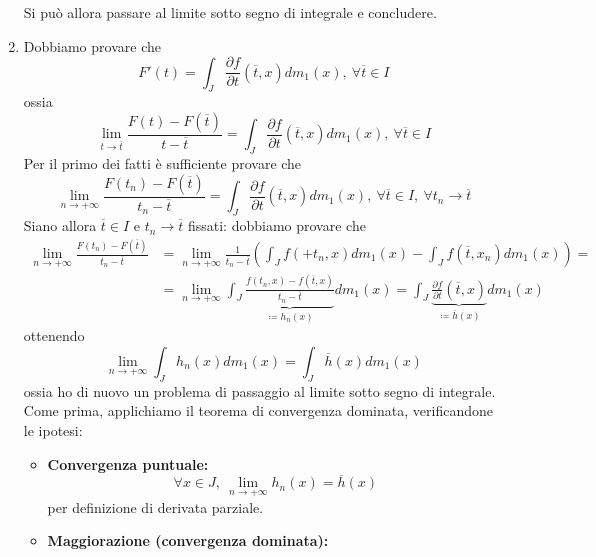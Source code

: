 \begin{demonstrationcaputwt}
\begin{enumerate}[label=\Roman*]
		Si può allora passare al limite sotto segno di integrale e concludere.
		\item Dobbiamo provare che
		\begin{equation*}
			F'(t)=\int_J\frac{\partial f}{\partial t}\left(\overline{t},x\right)dm_1(x),\ \forall \overline{t}\in I
		\end{equation*}
		ossia
		\begin{equation*}
			\lim_{t\to\overline{t}}\frac{F(t)-F\left(\overline{t}\right)}{t-\overline{t}}=\int_J\frac{\partial f}{\partial t}\left(\overline{t},x\right)dm_1(x),\ \forall \overline{t}\in I
		\end{equation*}
		Per il primo dei fatti è sufficiente provare che
		\begin{equation*}
			\lim_{n\to+\infty}\frac{F\left(t_n\right)-F\left(\overline{t}\right)}{t_n-\overline{t}}=\int_J\frac{\partial f}{\partial t}\left(\overline{t},x\right)dm_1(x),\ \forall \overline{t}\in I,\ \forall t_n\to \overline{t}
		\end{equation*}
		Siano allora $\overline{t}\in I$ e $t_n\to\overline{t}$ fissati: dobbiamo provare che
		\begin{align*}
			\lim_{n\to+\infty}\frac{F\left(t_n\right)-F\left(\overline{t}\right)}{t_n-\overline{t}}&=\lim_{n\to+\infty}\frac{1}{t_n-\overline{t}}\left(\int_Jf\left(+t_n,x\right)dm_1(x)-\int_Jf\left(\overline{t},x_n\right)dm_1(x)\right)=\\
			&=\lim_{n\to+\infty}\int_J\underbrace{\frac{f\left(t_n,x\right)-f\left(\overline{t},x\right)}{t_n-\overline{t}}}_{\coloneqq h_n(x)}dm_1(x)=\int_J\underbrace{\frac{\partial f}{\partial t}\left(\overline{t},x\right)}_{\coloneqq \overline{h}(x)}dm_1(x)
		\end{align*}
		ottenendo
		\begin{equation*}
			\lim_{n\to+\infty}\int_Jh_n(x)dm_1(x)=\int_J\overline{h}(x)dm_1(x)
		\end{equation*}
		ossia ho di nuovo un problema di passaggio al limite sotto segno di integrale. Come prima, applichiamo il teorema di convergenza dominata, verificandone le ipotesi:
		\begin{itemize}
			\item \textbf{Convergenza puntuale:}
			\begin{equation*}
				\forall x\in J,\ \lim_{n\to+\infty}h_n(x)=\overline{h}(x)
			\end{equation*}
			per definizione di derivata parziale.
			\item \textbf{Maggiorazione (convergenza dominata):}

\end{itemize}
\end{enumerate}
\end{demonstrationcaputwt}

